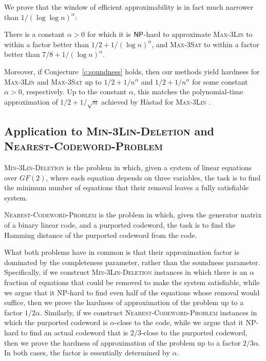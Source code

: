 We prove that the window of efficient approximability is in fact much
narrower than $1/(\log\log n)^{\alpha}$:
\begin{theorem} There is a constant $\alpha >0$ for which 
it is ${\sf {\sf NP}}$-hard to approximate \textsc{Max-3Lin} to within a
factor better than $1/2 + 1/(\log n)^{\alpha}$, and \textsc{Max-3Sat}
to within a factor better than $7/8 + 1/(\log n)^{\alpha}$.
\end{theorem}
Moreover, if Conjecture~\ref{c:soundness} holds, then our methods yield hardness
for \textsc{Max-3Lin} and \textsc{Max-3Sat} up to $1/2 + 1/n^{\alpha}$
and $1/2 + 1/n^{\alpha}$ for some constant $\alpha > 0$, respectively.
Up to the constant $\alpha$, this matches the polynomial-time
approximation of $1/2 + 1/\sqrt{n}$ achieved by H{\aa}stad for
\textsc{Max-3Lin} \cite{Has00}.

\subsection{Application to \textsc{Min-3Lin-Deletion} and \textsc{Nearest-Codeword-Problem}}

\textsc{Min-3Lin-Deletion} is the problem in which, given a system of linear equations over $GF(2)$, where each equation depends on three variables, the task is to find the minimum number of equations that their removal leaves a fully satisfiable system.

\textsc{Nearest-Codeword-Problem} is the problem in which, given the generator matrix of a binary linear code, and a purported codeword, the task is to find the Hamming distance of the purported codeword from the code. 

What both problems have in common is that their approximation factor is dominated by the completeness parameter, rather than the soundness parameter. Specifically, if we construct \textsc{Min-3Lin-Deletion} instances in which there is an $\alpha$ fraction of equations that could be removed to make the system satisfiable, while we argue that it {\sf NP}-hard to find even half of the equations whose removal would suffice, then we prove the hardness of approximation of the problem up to a factor $1/2\alpha$. Similarly, if we construct \textsc{Nearest-Codeword-Problem} instances in which the purported codeword is $\alpha$-close to the code, while we argue that it {\sf NP}-hard to find an actual codeword that is $2/3$-close to the purported codeword, then we prove the hardness of approximation of the problem up to a factor $2/3\alpha$.
In both cases, the factor is essentially determined by $\alpha$. 

